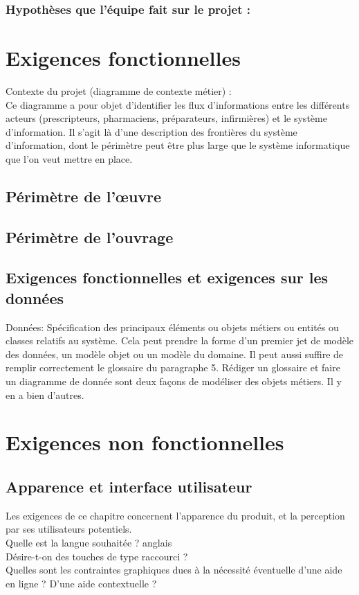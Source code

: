 			\subsubsection{Hypothèses que l’équipe fait sur le projet :}
		
	\section{Exigences fonctionnelles}
		{\color{red}
		Contexte du projet (diagramme de contexte métier) :\\	 
		Ce diagramme a pour objet d’identifier les flux d’informations entre les différents acteurs (prescripteurs, pharmaciens, préparateurs, infirmières) et le système d’information.
		Il s’agit là d’une description des frontières du système d’information, dont le périmètre peut être plus large que le système informatique que l’on veut mettre en place.
		}

		\subsection{Périmètre de l'œuvre}
		
		\subsection{Périmètre de l'ouvrage}

		\subsection{Exigences fonctionnelles et exigences sur les données}	
		{\color{red}
		Données: Spécification des principaux éléments ou objets métiers ou entités ou classes relatifs au système. Cela peut prendre la forme d’un premier jet de modèle des données, un modèle objet ou un modèle du domaine. Il peut aussi suffire de remplir correctement le glossaire du paragraphe 5. Rédiger un glossaire et faire un diagramme de donnée sont deux façons de modéliser des objets métiers. Il y en a bien d’autres.\\
		}
	
	\section{Exigences non fonctionnelles}
		\subsection{Apparence et interface utilisateur}
		{\color{red}
		Les exigences de ce chapitre concernent l’apparence du produit, et la perception par ses utilisateurs potentiels. \\
		Quelle est la langue souhaitée ? anglais\\
		Désire-t-on des touches de type raccourci ?\\
		Quelles sont les contraintes graphiques dues à la nécessité éventuelle d’une aide en ligne ? D’une aide contextuelle ?
		}

